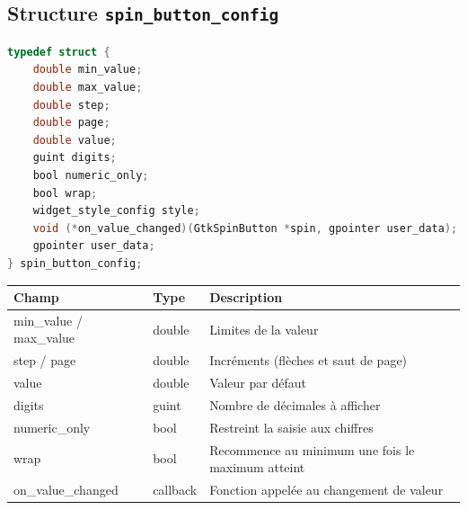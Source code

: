 \subsection{Structure \texttt{spin\_button\_config}}
\begin{lstlisting}[language=C]
typedef struct {
    double min_value;
    double max_value;
    double step;
    double page;
    double value;
    guint digits;
    bool numeric_only;
    bool wrap;
    widget_style_config style;
    void (*on_value_changed)(GtkSpinButton *spin, gpointer user_data);
    gpointer user_data;
} spin_button_config;
\end{lstlisting}
\bigskip
\begin{center}
\begin{tabular}{|l|l|>{\raggedright\arraybackslash}p{6cm}|}
\hline
\textbf{Champ} & \textbf{Type} & \textbf{Description} \\
\hline
min\_value / max\_value & double & Limites de la valeur \\
\hline
step / page & double & Incréments (flèches et saut de page) \\
\hline
value & double & Valeur par défaut \\
\hline
digits & guint & Nombre de décimales à afficher \\
\hline
numeric\_only & bool & Restreint la saisie aux chiffres \\
\hline
wrap & bool & Recommence au minimum une fois le maximum atteint \\
\hline
on\_value\_changed & callback & Fonction appelée au changement de valeur \\
\hline
\end{tabular}
\end{center}
\bigskip
